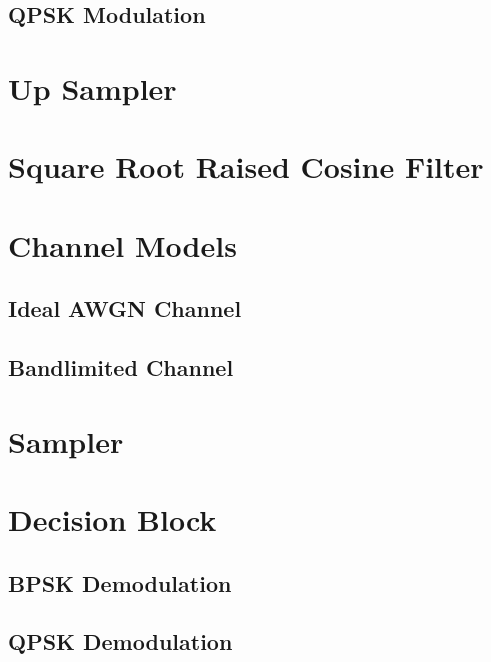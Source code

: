 \documentclass[]{article}
\begin{document}
\subsection{QPSK Modulation}
\label{app:qpsk_mod}


\section{Up Sampler}
\label{app:impulse_train}


\section{Square Root Raised Cosine Filter}
\label{app:sqrt_raised_cosine}


\section{Channel Models}
\subsection{Ideal AWGN Channel}
\label{app:awgn_channel}


\subsection{Bandlimited Channel}
\label{app:bandlimited}


\section{Sampler}
\label{app:sampler}


\section{Decision Block}
\label{app:dblocks}
\subsection{BPSK Demodulation}
\label{app:bpsk_demod}


\subsection{QPSK Demodulation}
\label{app:qpsk_demod}

\end{document}
